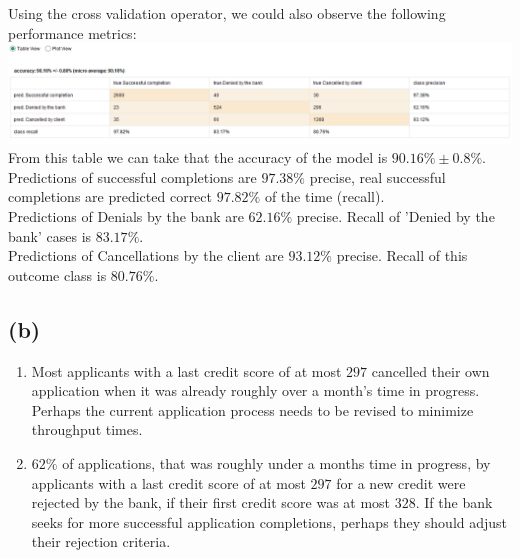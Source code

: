 \documentclass[../../main.tex]{subfiles}
\begin{document}
Using the cross validation operator, we could also observe the following performance metrics: \\
\includegraphics[width=\textwidth]{img/RapidMiner_Results_Performance.png}
From this table we can take that the accuracy of the model is $90.16\%\pm 0.8\%$.
Predictions of successful completions are $97.38\%$ precise, real successful completions are predicted correct $97.82\%$ of the time (recall).\\
Predictions of Denials by the bank are $62.16\%$ precise. Recall of 'Denied by the bank' cases is $83.17\%$.\\
Predictions of Cancellations by the client are $93.12\%$ precise. Recall of this outcome class is $80.76\%$.

\subsection*{(b)}
\begin{enumerate}
	\item	Most applicants with a last credit score of at most $297$ cancelled their own application when it was already roughly over a month's time in progress. Perhaps the current application process needs to be revised to minimize throughput times.
	\item	$62\%$ of applications, that was roughly under a months time in progress, by applicants with a last credit score of at most $297$ for a new credit were rejected by the bank, if their first credit score was at most $328$. If the bank seeks for more successful application completions, perhaps they should adjust their rejection criteria.
\end{enumerate}
\end{document}
